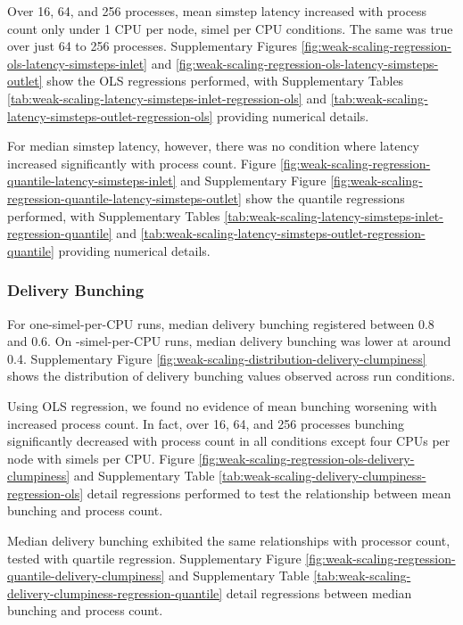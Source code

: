 Over 16, 64, and 256 processes, mean simstep latency increased with process count only under 1 CPU per node,  simel per CPU conditions.
The same was true over just 64 to 256 processes.
Supplementary Figures \ref{fig:weak-scaling-regression-ols-latency-simsteps-inlet} and \ref{fig:weak-scaling-regression-ols-latency-simsteps-outlet} show the OLS regressions performed, with
Supplementary Tables \ref{tab:weak-scaling-latency-simsteps-inlet-regression-ols} and \ref{tab:weak-scaling-latency-simsteps-outlet-regression-ols} providing numerical details.



For median simstep latency, however, there was no condition where latency increased significantly with process count.
Figure \ref{fig:weak-scaling-regression-quantile-latency-simsteps-inlet} and Supplementary Figure \ref{fig:weak-scaling-regression-quantile-latency-simsteps-outlet} show the quantile regressions performed, with Supplementary Tables \ref{tab:weak-scaling-latency-simsteps-inlet-regression-quantile} and \ref{tab:weak-scaling-latency-simsteps-outlet-regression-quantile} providing numerical details.

\subsubsection{Delivery Bunching}

For one-simel-per-CPU runs, median delivery bunching registered between 0.8 and 0.6.
On -simel-per-CPU runs, median delivery bunching was lower at around 0.4.
Supplementary Figure \ref{fig:weak-scaling-distribution-delivery-clumpiness}
shows the distribution of delivery bunching values observed across run conditions.



Using OLS regression, we found no evidence of mean bunching worsening with increased process count.
In fact, over 16, 64, and 256 processes bunching significantly decreased with process count in all conditions except four CPUs per node with  simels per CPU.
Figure \ref{fig:weak-scaling-regression-ols-delivery-clumpiness} and Supplementary Table \ref{tab:weak-scaling-delivery-clumpiness-regression-ols} detail regressions performed to test the relationship between mean bunching and process count.

Median delivery bunching exhibited the same relationships with processor count, tested with quartile regression.
Supplementary Figure \ref{fig:weak-scaling-regression-quantile-delivery-clumpiness} and Supplementary Table \ref{tab:weak-scaling-delivery-clumpiness-regression-quantile} detail regressions between median bunching and process count.


